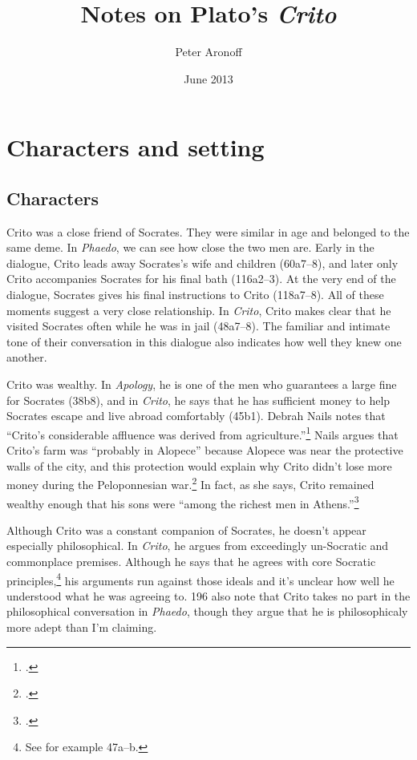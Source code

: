\documentclass[12pt,letterpaper]{article}
\begin{document}
\begin{titlepage}
\title{Notes on Plato's \textit{Crito}}
\author{Peter Aronoff}
\date{June 2013}
\maketitle
\thispagestyle{empty}
\end{titlepage}

\section*{Characters and setting}

\subsection*{Characters}

Crito was a close friend of Socrates. They were similar in age and belonged to the same deme. In \textit{Phaedo}, we can see how close the two men are. Early in the dialogue, Crito leads away Socrates's wife and children (60a7--8), and later only Crito accompanies Socrates for his final bath (116a2--3). At the very end of the dialogue, Socrates gives his final instructions to Crito (118a7--8). All of these moments suggest a very close relationship. In \textit{Crito}, Crito makes clear that he visited Socrates often while he was in jail (48a7--8). The familiar and intimate tone of their conversation in this dialogue also indicates how well they knew one another.

Crito was wealthy. In \textit{Apology}, he is one of the men who guarantees a large fine for Socrates (38b8), and in \textit{Crito}, he says that he has sufficient money to help Socrates escape and live abroad comfortably (45b1). Debrah Nails notes that ``Crito's considerable affluence was derived from agriculture.''\footcite[][115. She cites \textit{Euthydemus} 291e, Xenophon's \textit{Memorabilia} 2.9.4, and Diogenes Laertius 2.31.]{nails2002-people-of-plato} Nails argues that Crito's farm was ``probably in Alopece'' because Alopece was near the protective walls of the city, and this protection would explain why Crito didn't lose more money during the Peloponnesian war.\footcite[][115]{nails2002-people-of-plato} In fact, as she says, Crito remained wealthy enough that his sons were ``among the richest men in Athens.''\footcite[][115]{nails2002-people-of-plato}

Although Crito was a constant companion of Socrates, he doesn't appear especially philosophical. In \textit{Crito}, he argues from exceedingly un-Socratic and commonplace premises. Although he says that he agrees with core Socratic principles,\footnote{See for example 47a--b.} his arguments run against those ideals and it's unclear how well he understood what he was agreeing to. \cite{brickhouse-smith2004-plato-trial-of-socrates} 196 also note that Crito takes no part in the philosophical conversation in \textit{Phaedo}, though they argue that he is philosophicaly more adept than I'm claiming.
\end{document}
